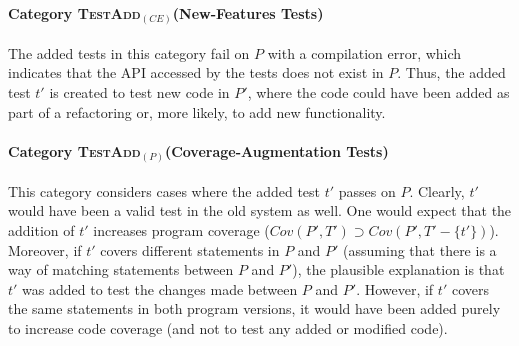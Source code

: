 \documentclass[conference]{IEEEtran}
\newcommand{\lang}[1]{\texttt{\small #1}}
\newcommand{\subject}[1]{\texttt{\small #1}}
\newcommand{\mt}{\mathit}
\newcommand{\covfunc}[2]{\mt{Cov(#1, #2)}}
\newcommand{\cataddce}{\textsc{TestAdd}$_\mt{(CE)}$}
\newcommand{\cataddp}{\textsc{TestAdd}$_\mt{(P)}$}
\begin{document}


\paragraph{Category \cataddce (New-Features Tests)}
\label{sec:category-addce}

The added tests in this category fail on $P$ with a compilation error,
which indicates that the API accessed by the tests does not exist in
$P$. Thus, the added test $t'$ is created to test new code in $P'$,
where the code could have been added as part of a refactoring or, more
likely, to add new functionality.



\paragraph{Category \cataddp (Coverage-Augmentation Tests)}
\label{sec:category-addp}

This category considers cases where the added test $t'$ passes on
$P$. Clearly, $t'$ would have been a valid test in the old system as
well. One would expect that the addition of $t'$ increases program
coverage (\ie $\covfunc{P'}{T'} \supset \covfunc{P'}{T' -
  \{t'\}}$). Moreover, if $t'$ covers different statements in $P$ and
$P'$ (assuming that there is a way of matching statements between $P$
and $P'$), the plausible explanation is that $t'$ was added to test
the changes made between $P$ and $P'$. However, if $t'$ covers the
same statements in both program versions, it would have been added
purely to increase code coverage (and not to test any added or
modified code).
\end{document}
